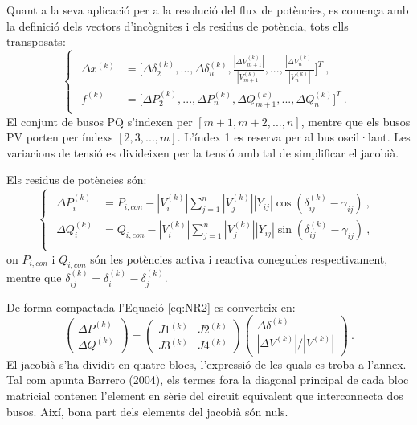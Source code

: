Quant a la seva aplicació per a la resolució del flux de potències, es comença amb la definició dels vectors d'incògnites i els residus de potència, tots ells transposats:
\begin{equation}
    \begin{cases}
    \begin{split}
        \Delta x^{(k)}&=\biggl[\Delta \delta^{(k)}_2, ..., \Delta \delta^{(k)}_n, \frac{|\Delta V^{(k)}_{m+1}|}{|V^{(k)}_{m+1}|}, ...,\frac{|\Delta V^{(k)}_{n}|}{|V^{(k)}_{n}|}\biggr]^T\ ,\\
        f^{(k)}&=\biggl[\Delta P^{(k)}_2, ..., \Delta P^{(k)}_n, \Delta Q^{(k)}_{m+1}, ..., \Delta Q^{(k)}_{n}\biggr]^T\ .
    \end{split}
\end{cases}
\label{eq:NR5}
\end{equation}
El conjunt de busos PQ s'indexen per $[m+1, m+2, ..., n]$, mentre que els busos PV porten per índexs $[2, 3, ..., m]$. L'índex 1 es reserva per al bus oscil·lant. Les variacions de tensió es divideixen per la tensió amb tal de simplificar el jacobià. 

Els residus de potències són:
\begin{equation}
    \begin{cases}
    \begin{split}
        \Delta P^{(k)}_i&=P_{i,con}-|V^{(k)}_i|\sum_{j=1}^{n}|V^{(k)}_j||Y_{ij}|\cos (\delta^{(k)}_{ij}-\gamma_{ij})\ ,\\
        \Delta Q^{(k)}_i&=Q_{i,con}-|V^{(k)}_i|\sum_{j=1}^{n}|V^{(k)}_j||Y_{ij}|\sin (\delta^{(k)}_{ij}-\gamma_{ij})\ ,\\
    \end{split}
\end{cases}
\label{eq:NR6}
\end{equation}
on $P_{i,con}$ i $Q_{i,con}$ són les potències activa i reactiva conegudes respectivament, mentre que $\delta^{(k)}_{ij}=\delta^{(k)}_{i}-\delta^{(k)}_{j}$. 

De forma compactada l'Equació \ref{eq:NR2} es converteix en:
\begin{equation}
    \begin{pmatrix}
        \Delta P^{(k)}\\
        \Delta Q^{(k)}
    \end{pmatrix}
    = \begin{pmatrix}
        J1^{(k)} & J2^{(k)}\\
        J3^{(k)} & J4^{(k)}
    \end{pmatrix}
    \begin{pmatrix}
        \Delta \delta^{(k)}\\
        |\Delta V^{(k)}|/|V^{(k)}|
    \end{pmatrix}\ .
\label{eq:NR7}
\end{equation}
El jacobià s'ha dividit en quatre blocs, l'expressió de les quals es troba a l'annex. Tal com apunta Barrero (2004), els termes fora la diagonal principal de cada bloc matricial contenen l'element en sèrie del circuit equivalent que interconnecta dos busos. Així, bona part dels elements del jacobià són nuls. 

